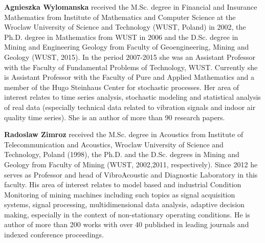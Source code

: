 \documentclass[conference,a4paper]{IEEEtran}
\begin{document}
\textbf{Agnieszka Wylomanska} received the M.Sc. degree in Financial and Insurance Mathematics from Institute of Mathematics and Computer Science at the Wroclaw University of Science and Technology (WUST, Poland)  in 2002, the Ph.D. degree in Mathematics from WUST in 2006 and the D.Sc. degree in Mining and Engineering Geology from Faculty of Geoengineering, Mining and Geology (WUST, 2015). In the period 2007-2015 she was an Assistant Professor with the Faculty of Fundamental Problems of Technology, WUST. Currently she is Assistant Professor with the Faculty of Pure and Applied Mathematics and a member of the Hugo Steinhaus Center for stochastic processes. Her area of interest relates to time series analysis, stochastic modeling and statistical analysis of real data (especially technical data related to vibration signals and indoor air quality time series). She is an author of more than 90 research papers.

\textbf{Radoslaw Zimroz} received the M.Sc. degree in Acoustics from Institute of Telecommunication and Acoustics, Wroclaw University of Science and Technology, Poland (1998), the Ph.D. and the D.Sc. degrees in Mining and Geology from Faculty of Mining (WUST, 2002,2011, respectively). Since 2012 he serves as Professor and head of VibroAcoustic and Diagnostic Laboratory in this faculty. His area of interest relates to model based and industrial Condition Monitoring of mining machines including such topics as signal acquisition systems, signal processing, multidimensional data analysis, adaptive decision making, especially in the context of non-stationary operating conditions. He is author of more than 200 works with over 40 published in leading journals and indexed conference proceedings.


\end{document}
